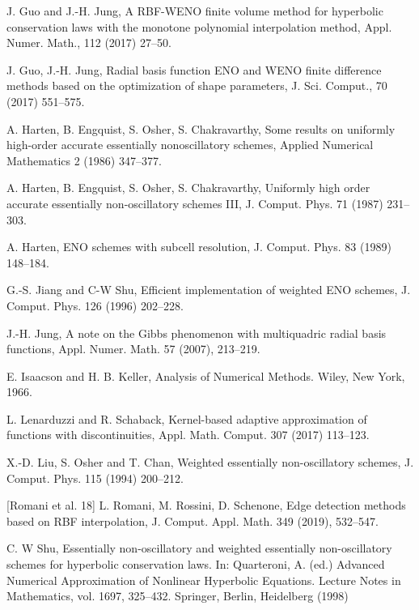 \documentclass[xcolor=dvipsnames,9pt,mathserif]{beamer}
\begin{document}
\begin{thebibliography}{10}
J. Guo and J.-H. Jung, A RBF-WENO finite volume method for hyperbolic conservation laws with the monotone polynomial interpolation method,
Appl. Numer. Math., 112 (2017) 27--50.

J. Guo, J.-H. Jung, Radial basis function ENO and WENO finite difference methods based on the optimization of shape parameters,
J. Sci. Comput., 70 (2017) 551--575.


A. Harten, B. Engquist, S. Osher, S. Chakravarthy, Some results on uniformly high-order accurate essentially nonoscillatory schemes,
Applied Numerical Mathematics 2 (1986) 347--377.


A. Harten, B. Engquist, S. Osher, S. Chakravarthy, Uniformly high order accurate essentially non-oscillatory schemes III,
J. Comput. Phys. 71 (1987) 231--303.

 A. Harten, ENO schemes with subcell resolution, J. Comput. Phys. 83 (1989) 148--184.


G.-S. Jiang and C-W Shu, Efficient implementation of weighted {ENO} schemes, J. Comput. Phys. 126 (1996) 202--228.


J.-H. Jung, A note on the Gibbs phenomenon with multiquadric radial basis functions, Appl. Numer. Math. 57 (2007), 213--219.


{
E. Isaacson and H. B. Keller, Analysis of Numerical Methods. Wiley, New York, 1966.
}



L. Lenarduzzi and R. Schaback, Kernel-based adaptive approximation of functions with discontinuities, Appl. Math. Comput. 307 (2017) 113--123.

X.-D. Liu, S. Osher and T. Chan, Weighted essentially non-oscillatory schemes, J. Comput. Phys. 115 (1994) 200--212.

[Romani et al. 18] L. Romani, M. Rossini, D. Schenone, Edge detection methods based on RBF interpolation, J. Comput. Appl.
Math. 349 (2019), 532--547.

 C. W Shu, Essentially non-oscillatory and weighted essentially non-oscillatory schemes for hyperbolic
conservation laws. In: Quarteroni, A. (ed.) Advanced Numerical Approximation of Nonlinear Hyperbolic
Equations. Lecture Notes in Mathematics, vol. 1697,  325--432. Springer, Berlin, Heidelberg (1998)

\end{thebibliography}
\end{document}
